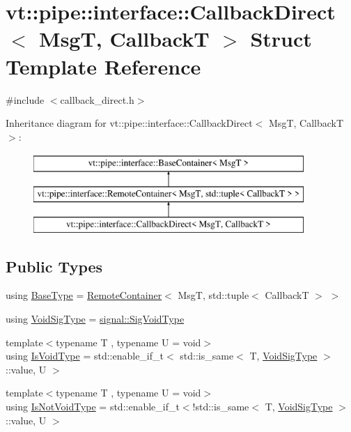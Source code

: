 \hypertarget{structvt_1_1pipe_1_1interface_1_1_callback_direct}{}\section{vt\+:\+:pipe\+:\+:interface\+:\+:Callback\+Direct$<$ MsgT, CallbackT $>$ Struct Template Reference}
\label{structvt_1_1pipe_1_1interface_1_1_callback_direct}


{\ttfamily \#include $<$callback\+\_\+direct.\+h$>$}

Inheritance diagram for vt\+:\+:pipe\+:\+:interface\+:\+:Callback\+Direct$<$ MsgT, CallbackT $>$\+:\begin{figure}[H]
\begin{center}
\leavevmode
\includegraphics[height=3.000000cm]{structvt_1_1pipe_1_1interface_1_1_callback_direct}
\end{center}
\end{figure}
\subsection*{Public Types}
\begin{DoxyCompactItemize}
\item 
using \hyperlink{structvt_1_1pipe_1_1interface_1_1_callback_direct_aa69955f3321f6aa14a80a9b8d876025d}{Base\+Type} = \hyperlink{structvt_1_1pipe_1_1interface_1_1_remote_container}{Remote\+Container}$<$ MsgT, std\+::tuple$<$ CallbackT $>$ $>$
\item 
using \hyperlink{structvt_1_1pipe_1_1interface_1_1_callback_direct_ae35dd09260d13dbdd8444a208e552070}{Void\+Sig\+Type} = \hyperlink{namespacevt_1_1pipe_1_1signal_acbe257d1ae44f20fa9fd9b6ed3057caf}{signal\+::\+Sig\+Void\+Type}
\item 
{\footnotesize template$<$typename T , typename U  = void$>$ }\\using \hyperlink{structvt_1_1pipe_1_1interface_1_1_callback_direct_a404a37ff25faa985a51a410ec70b4900}{Is\+Void\+Type} = std\+::enable\+\_\+if\+\_\+t$<$ std\+::is\+\_\+same$<$ T, \hyperlink{structvt_1_1pipe_1_1interface_1_1_callback_direct_ae35dd09260d13dbdd8444a208e552070}{Void\+Sig\+Type} $>$\+::value, U $>$
\item 
{\footnotesize template$<$typename T , typename U  = void$>$ }\\using \hyperlink{structvt_1_1pipe_1_1interface_1_1_callback_direct_a619c2c4c96ec2573b87b992344c48826}{Is\+Not\+Void\+Type} = std\+::enable\+\_\+if\+\_\+t$<$!std\+::is\+\_\+same$<$ T, \hyperlink{structvt_1_1pipe_1_1interface_1_1_callback_direct_ae35dd09260d13dbdd8444a208e552070}{Void\+Sig\+Type} $>$\+::value, U $>$
\end{DoxyCompactItemize}
